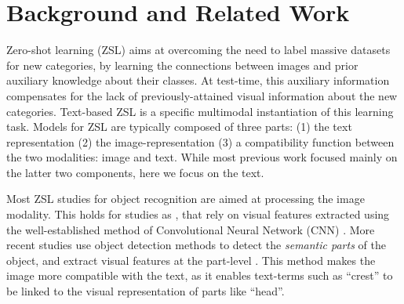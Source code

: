 \documentclass[11pt,a4paper]{article}
\newcommand\reut[1]{\textcolor{green}{\textbf{REUT:} #1 }}
\begin{document}
\section{Background and Related Work}

Zero-shot learning (ZSL) %
aims at overcoming the need to label massive datasets for new categories, by learning the connections between images and prior auxiliary knowledge about their classes. At test-time, this auxiliary information compensates for the lack of previously-attained visual information about  the new categories.
Text-based ZSL is a specific multimodal instantiation of this learning task. Models for ZSL are typically composed of three parts: (1) the text representation (2) the image-representation (3) a compatibility function between the two modalities: image and text.   While most previous work focused mainly on the latter two components, here we %
focus on the text.  

Most ZSL  studies   for object recognition are aimed at processing  the image modality. This holds for studies as \citet{xu2018attngan,lei2015predicting,qiao2016less,akata2016multi}, that rely on visual features  extracted using the well-established method of
Convolutional Neural Network (CNN) \cite{lecun1995convolutional}. More recent studies use object detection methods to detect the {\em semantic parts} of the object, and extract visual features at the part-level \cite{elhoseiny2017link,zhu2018generative,zhang2016spda}. This
method makes the image more compatible with the text, as it enables text-terms such as \enquote{crest} to be linked to the visual representation of parts like \enquote{head}. 
\end{document}
